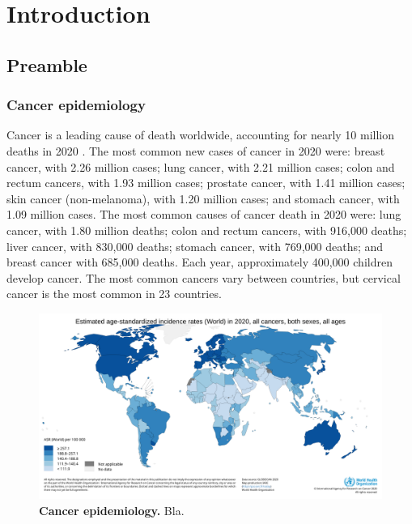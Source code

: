 \chapter{Introduction}

\section{Preamble}

\subsection{Cancer epidemiology}

Cancer is a leading cause of death worldwide, accounting for nearly
10 million deaths in 2020 \cite{ferlay_cancer_2021}. The most common new cases
of cancer in 2020 were:
breast cancer, with 2.26 million cases;
lung cancer, with 2.21 million cases;
colon and rectum cancers, with 1.93 million cases;
prostate cancer, with 1.41 million cases;
skin cancer (non-melanoma), with 1.20 million cases;
and stomach cancer, with 1.09 million cases.
The most common causes of cancer death in 2020 were:
lung cancer, with 1.80 million deaths;
colon and rectum cancers, with 916,000 deaths;
liver cancer, with 830,000 deaths;
stomach cancer, with 769,000 deaths;
and breast cancer with 685,000 deaths.
Each year, approximately 400,000 children develop cancer. The most common
cancers vary between countries, but cervical cancer is the most common in 23
countries.

\begin{figure}[h]
    \includegraphics[width=1\textwidth]{images/intro/cancer-asr-world.png}
    \centering
    \caption{ \textbf{Cancer epidemiology.} Bla. }
    \label{fig:cancer-asr}
\end{figure}

